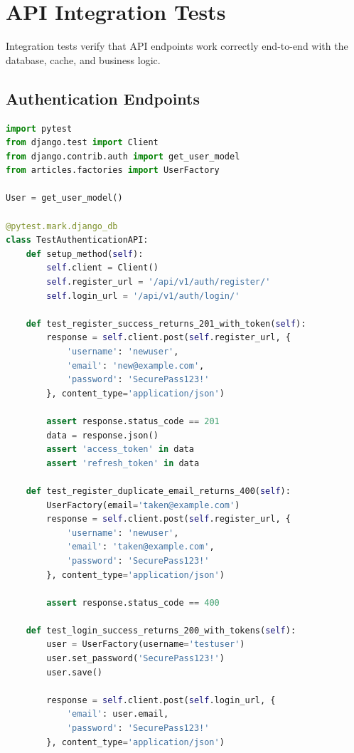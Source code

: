 \documentclass{report}
\begin{document}
\section{API Integration Tests}

Integration tests verify that API endpoints work correctly end-to-end with the database, cache, and business logic.

\subsection{Authentication Endpoints}

\begin{lstlisting}[language=Python, caption=Authentication API integration tests]
import pytest
from django.test import Client
from django.contrib.auth import get_user_model
from articles.factories import UserFactory

User = get_user_model()

@pytest.mark.django_db
class TestAuthenticationAPI:
    def setup_method(self):
        self.client = Client()
        self.register_url = '/api/v1/auth/register/'
        self.login_url = '/api/v1/auth/login/'

    def test_register_success_returns_201_with_token(self):
        response = self.client.post(self.register_url, {
            'username': 'newuser',
            'email': 'new@example.com',
            'password': 'SecurePass123!'
        }, content_type='application/json')
        
        assert response.status_code == 201
        data = response.json()
        assert 'access_token' in data
        assert 'refresh_token' in data

    def test_register_duplicate_email_returns_400(self):
        UserFactory(email='taken@example.com')
        response = self.client.post(self.register_url, {
            'username': 'newuser',
            'email': 'taken@example.com',
            'password': 'SecurePass123!'
        }, content_type='application/json')
        
        assert response.status_code == 400

    def test_login_success_returns_200_with_tokens(self):
        user = UserFactory(username='testuser')
        user.set_password('SecurePass123!')
        user.save()
        
        response = self.client.post(self.login_url, {
            'email': user.email,
            'password': 'SecurePass123!'
        }, content_type='application/json')
        

\end{lstlisting}
\end{document}
